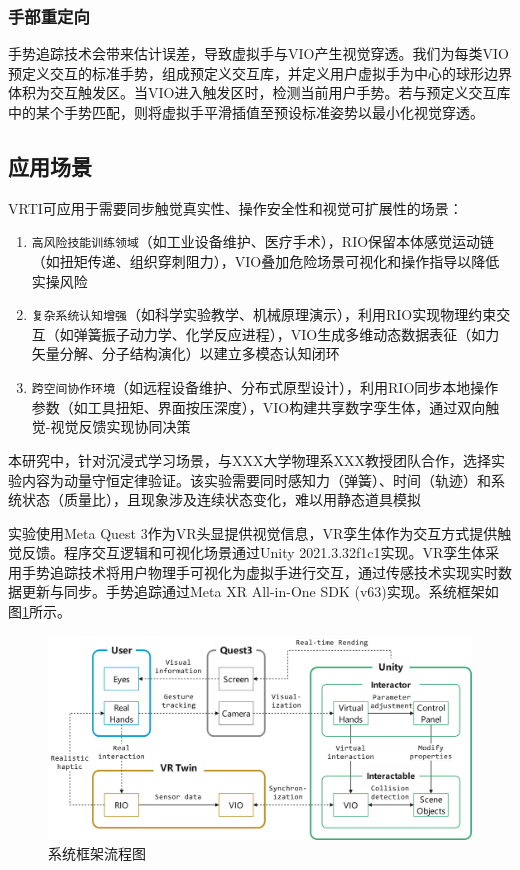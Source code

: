 \documentclass[runningheads]{llncs}
\begin{document}
\subsubsection{手部重定向}
手势追踪技术会带来估计误差，导致虚拟手与VIO产生视觉穿透。我们为每类VIO预定义交互的标准手势，组成预定义交互库，并定义用户虚拟手为中心的球形边界体积为交互触发区。当VIO进入触发区时，检测当前用户手势。若与预定义交互库中的某个手势匹配，则将虚拟手平滑插值至预设标准姿势以最小化视觉穿透。


\subsection{应用场景}
VRTI可应用于需要同步触觉真实性、操作安全性和视觉可扩展性的场景：
\begin{enumerate}
  \item \texttt{高风险技能训练领域}（如工业设备维护、医疗手术），RIO保留本体感觉运动链（如扭矩传递、组织穿刺阻力），VIO叠加危险场景可视化和操作指导以降低实操风险
  \item \texttt{复杂系统认知增强}（如科学实验教学、机械原理演示），利用RIO实现物理约束交互（如弹簧振子动力学、化学反应进程），VIO生成多维动态数据表征（如力矢量分解、分子结构演化）以建立多模态认知闭环
  \item \texttt{跨空间协作环境}（如远程设备维护、分布式原型设计），利用RIO同步本地操作参数（如工具扭矩、界面按压深度），VIO构建共享数字孪生体，通过双向触觉-视觉反馈实现协同决策
\end{enumerate}

本研究中，针对沉浸式学习场景，与XXX大学物理系XXX教授团队合作，选择实验内容为动量守恒定律验证。该实验需要同时感知力（弹簧）、时间（轨迹）和系统状态（质量比），且现象涉及连续状态变化，难以用静态道具模拟

实验使用Meta Quest 3作为VR头显提供视觉信息，VR孪生体作为交互方式提供触觉反馈。程序交互逻辑和可视化场景通过Unity 2021.3.32f1c1实现。VR孪生体采用手势追踪技术将用户物理手可视化为虚拟手进行交互，通过传感技术实现实时数据更新与同步。手势追踪通过Meta XR All-in-One SDK (v63)实现。系统框架如图\ref{fig:system-framework-flowchart}所示。

\begin{figure}[t]
  \centering
  \includegraphics[width=1\textwidth]{image/system-framework-flowchart.pdf}
  \caption{系统框架流程图}
  \label{fig:system-framework-flowchart}
\end{figure}
\end{document}

